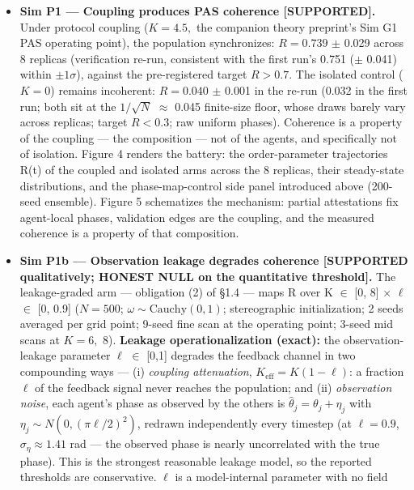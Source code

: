 \documentclass[
]{article}
\begin{document}
\begin{itemize}
\item
  \textbf{Sim P1 --- Coupling produces PAS coherence {[}SUPPORTED{]}.}
  Under protocol coupling (\(K = 4.5,\) the companion theory preprint's
  Sim G1 PAS operating point), the population synchronizes:
  \(R = 0.739\) \(\pm\) 0.029 across 8 replicas (verification re-run,
  consistent with the first run's 0.751 (\(\pm\) 0.041) within
  \(\pm 1\sigma\)), against the pre-registered target \(R > 0.7.\) The
  isolated control (\(K = 0\)) remains incoherent: \(R = 0.040\) \(\pm\)
  0.001 in the re-run (0.032 in the first run; both sit at the
  \(1/\sqrt{N}\) \(\approx\) 0.045 finite-size floor, whose draws barely
  vary across replicas; target \(R < 0.3\); raw uniform phases).
  Coherence is a property of the coupling --- the composition --- not of
  the agents, and specifically not of isolation. Figure 4 renders the
  battery: the order-parameter trajectories R(t) of the coupled and
  isolated arms across the 8 replicas, their steady-state distributions,
  and the phase-map-control side panel introduced above (200-seed
  ensemble). Figure 5 schematizes the mechanism: partial attestations
  fix agent-local phases, validation edges are the coupling, and the
  measured coherence is a property of that composition.
\item
  \textbf{Sim P1b --- Observation leakage degrades coherence
  {[}SUPPORTED qualitatively; HONEST NULL on the quantitative
  threshold{]}.} The leakage-graded arm --- obligation (2) of §1.4 ---
  maps R over K \(\in\) {[}0, 8{]} \(\times\) \(\ell\) \(\in\) {[}0,
  0.9{]} (\(N = 500\); \(\omega \sim \mathrm{Cauchy}(0,1)\);
  stereographic initialization; 2 seeds averaged per grid point; 9-seed
  fine scan at the operating point; 3-seed mid scans at \(K = 6,\) 8).
  \textbf{Leakage operationalization (exact):} the observation-leakage
  parameter \(\ell\) \(\in\) {[}0,1{]} degrades the feedback channel in
  two compounding ways --- (i) \emph{coupling attenuation},
  \(K_{\mathrm{eff}} = K(1 - \ell)\): a fraction \(\ell\) of the
  feedback signal never reaches the population; and (ii)
  \emph{observation noise}, each agent's phase as observed by the others
  is \(\hat{\theta}_j = \theta_j + \eta_j\) with
  \(\eta_j \sim N(0, (\pi\ell/2)^2)\), redrawn independently every
  timestep (at \(\ell = 0.9\), \(\sigma_\eta \approx 1.41\) rad --- the
  observed phase is nearly uncorrelated with the true phase). This is
  the strongest reasonable leakage model, so the reported thresholds are
  conservative. \(\ell\) is a model-internal parameter with no field

\end{itemize}
\end{document}
